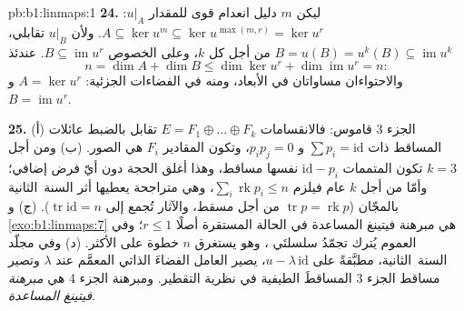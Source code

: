 \begin{solution}{pb:b1:linmaps:1}
\textbf{24.} ليكن $m$ دليل انعدام قوى للمقدار $u|_A$: $A
\subseteq \ker u^{m} \subseteq \ker u^{\max(m,r)} = \ker u^{r}$.
ولأن $u|_B$ تقابلي، $B = u(B) = u^{k}(B) \subseteq
\operatorname{im} u^{k}$ من أجل كل $k$، وعلى الخصوص $B
\subseteq \operatorname{im} u^{r}$. عندئذ
\[
n = \dim A + \dim B \leq \dim\ker u^{r} +
\dim\operatorname{im} u^{r} = n :
\]
والاحتواءان مساواتان في الأبعاد، ومنه في
الفضاءات الجزئية: $A = \ker u^{r}$ و $B = \operatorname{im} u^{r}$.

\textbf{25.} (أ) الجزء 3 قاموس: فالانقسامات $E = F_1
\oplus \dots \oplus F_k$ تقابل بالضبط عائلات
المساقط ذات $\sum p_i = \mathrm{id}$ و $p_i p_j = 0$، وتكون
المقادير $F_i$ هي الصور. (ب) ومن أجل $k = 3$ تكون المتممات
$\mathrm{id} - p_i$ نفسها مساقط، وهذا أغلق
الحجة دون أيّ فرض إضافي؛ وأمّا من أجل $k$ عام فيلزم
$\sum_i \operatorname{rk} p_i \leq n$، وهي متراجحة يعطيها
أثر السنة~الثانية بالمجّان ($\operatorname{tr} p = \operatorname{rk}
p$ من أجل مسقط، والآثار تُجمع إلى $\operatorname{tr}
\mathrm{id} = n$). (ج) و \cref{exo:b1:linmaps:7} هي مبرهنة
فيتينغ المساعدة في الحالة المستقرة أصلًا $r \leq 1$؛ وفي العموم
يُترك تجمّدُ سلسلتَي  ، وهو يستغرق $n$ خطوة
على الأكثر. (د) وفي مجلّد السنة~الثانية، مطبَّقةً على $u - \lambda\,
\mathrm{id}$، يصير العامل  الفضاءَ
الذاتي المعمَّم عند $\lambda$ وتصير مساقط الجزء 3
المساقطَ الطيفية في نظرية التقطير. ومبرهنة
الجزء 4 هي \emph{مبرهنة فيتينغ المساعدة}.
\end{solution}
